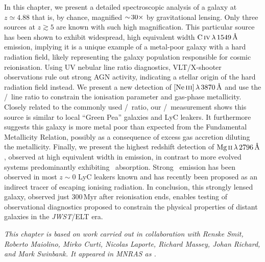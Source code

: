    \fancyhf{}
    \fancyfoot[C]{\color{black}\thepage}
    \newpage
    \setFancyHdr
\fi

\vspace*{\fill}

\noindent In this chapter, we present a detailed spectroscopic analysis of a galaxy at $z \simeq 4.88$ that is, by chance, magnified $\sim \! 30\times$ by gravitational lensing. Only three sources at $z \gtrsim 5$ are known with such high magnification. This particular source has been shown to exhibit widespread, high equivalent width $\CIV \, \lambda \, 1549 \, \Angstrom$ emission, implying it is a unique example of a metal-poor galaxy with a hard radiation field, likely representing the galaxy population responsible for cosmic reionisation. Using UV nebular line ratio diagnostics, VLT/X-shooter observations rule out strong AGN activity, indicating a stellar origin of the hard radiation field instead. We present a new detection of $\NeIII \, \lambda \, 3870 \, \Angstrom$ and use the \NeIII/\OII\ line ratio to constrain the ionisation parameter and gas-phase metallicity. Closely related to the commonly used \OIIIf/\OII\ ratio, our \NeIII/\OII\ measurement shows this source is similar to local ``Green Pea'' galaxies and LyC leakers. It furthermore suggests this galaxy is more metal poor than expected from the Fundamental Metallicity Relation, possibly as a consequence of excess gas accretion diluting the metallicity. Finally, we present the highest redshift detection of $\MgII \, \lambda \, 2796 \, \Angstrom$, observed at high equivalent width in emission, in contrast to more evolved systems predominantly exhibiting \MgII\ absorption. Strong \MgII\ emission has been observed in most $z \sim 0$ LyC leakers known and has recently been proposed as an indirect tracer of escaping ionising radiation. In conclusion, this strongly lensed galaxy, observed just $300 \, \mathrm{Myr}$ after reionisation ends, enables testing of observational diagnostics proposed to constrain the physical properties of distant galaxies in the \textit{JWST}/ELT era.

\vspace{3ex}
\begin{mdframed}[backgroundcolor=black!2.5]
    \textsl{This chapter is based on work carried out in collaboration with Renske Smit, Roberto Maiolino, Mirko Curti, Nicolas Laporte, Richard Massey, Johan Richard, and Mark Swinbank. It appeared in MNRAS as \citet*{2021MNRAS.508.1686W}.}
\end{mdframed}
\vspace*{\fill}

